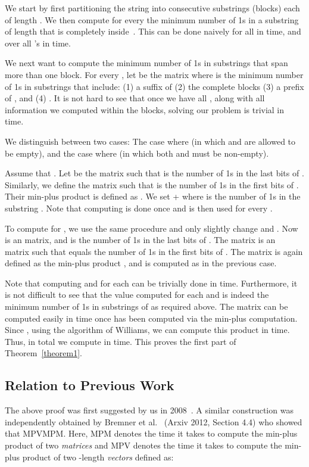 \documentclass[11pt]{llncs}
\begin{document}
We start by first partitioning the string  into consecutive substrings (blocks)  each of length . We then compute for every  the minimum number of 1s in a substring of length  that is completely inside~. This can be done naively for all  in  time, and over all 's in  time.


We next want to compute the minimum number of 1s in substrings that span more than one block. For every , let  be the   matrix where  is the minimum number of 1s in substrings that include: (1) a suffix  of  (2) the complete blocks  (3) a prefix  of , and (4) . It is not hard to see that once we have all , along with all information we computed within the blocks, solving our problem is trivial in  time.

We distinguish between two cases: The case where  (in which  and  are allowed to be empty), and the case where  (in which both  and  must be non-empty).

Assume that . Let  be the   matrix such that  is the number of 1s in the last  bits of . Similarly, we define the  matrix  such that  is the number of 1s in the first  bits of . Their min-plus product  is defined as . We set  +  where  is the number of 1s in the substring . Note that computing  is done once and is then used for every .

To compute  for , we use the same procedure and only slightly change  and . Now  is an   matrix, and  is the number of 1s in the last  bits of . The matrix  is an~  matrix such that  equals the number of 1s in the first  bits of . The matrix  is again defined as the min-plus product , and  is computed as in the previous case.

Note that computing  and  for each  can be trivially done in  time. Furthermore, it is not difficult to see that  the value  computed for each  and  is indeed the minimum number of 1s in substrings of  as required above. The matrix  can be computed easily in  time once  has been computed via the min-plus computation. Since , using the algorithm of Williams, we can compute this product in  time. Thus, in total we compute  in  time. This proves the first part of Theorem~\ref{theorem1}.

\subsection{Relation to Previous Work}
The above proof was first suggested by us in 2008~\cite{Private2008}. A similar construction was independently obtained by Bremner et al.~\cite{BCDEHILT06} (Arxiv 2012, Section 4.4) who showed that MPVMPM.  Here, MPM denotes the time it takes to compute the min-plus product of two  {\em matrices} and  MPV denotes the time it takes to compute the min-plus product of two -length {\em vectors}  
defined as: \vspace{-0.07in} 
\end{document}
